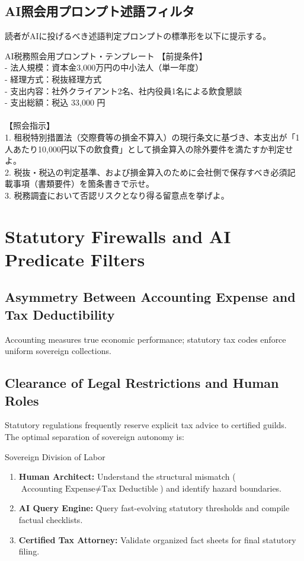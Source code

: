 \section{AI照会用プロンプト述語フィルタ}
読者がAIに投げるべき述語判定プロンプトの標準形を以下に提示する。

\begin{calcbox}{AI税務照会用プロンプト・テンプレート}
\small\ttfamily
【前提条件】\\
- 法人規模：資本金3,000万円の中小法人（単一年度）\\
- 経理方式：税抜経理方式\\
- 支出内容：社外クライアント2名、社内役員1名による飲食懇談\\
- 支出総額：税込 33,000 円\\
\\
【照会指示】\\
1. 租税特別措置法（交際費等の損金不算入）の現行条文に基づき、本支出が「1人あたり10,000円以下の飲食費」として損金算入の除外要件を満たすか判定せよ。\\
2. 税抜・税込の判定基準、および損金算入のために会社側で保存すべき必須記載事項（書類要件）を箇条書きで示せ。\\
3. 税務調査において否認リスクとなり得る留意点を挙げよ。
\end{calcbox}

\else
\chapter{Statutory Firewalls and AI Predicate Filters}
\label{chap:tax_ai_filter}

\section{Asymmetry Between Accounting Expense and Tax Deductibility}
Accounting measures true economic performance; statutory tax codes enforce uniform sovereign collections. 



\section{Clearance of Legal Restrictions and Human Roles}
Statutory regulations frequently reserve explicit tax advice to certified guilds. The optimal separation of sovereign autonomy is:
\begin{rulebox}{Sovereign Division of Labor}
\begin{enumerate}
    \item \textbf{Human Architect:} Understand the structural mismatch ($\text{Accounting Expense} \neq \text{Tax Deductible}$) and identify hazard boundaries.
    \item \textbf{AI Query Engine:} Query fast-evolving statutory thresholds and compile factual checklists.
    \item \textbf{Certified Tax Attorney:} Validate organized fact sheets for final statutory filing.
\end{enumerate}
\end{rulebox}

